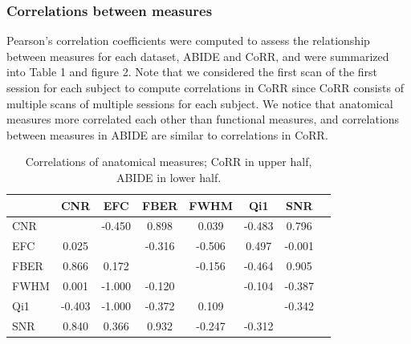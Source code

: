 \documentclass{frontiersSCNS} %
\begin{document}
\subsubsection{Correlations between measures}
\label{sec:25}
Pearson’s correlation coefficients were computed to assess the relationship between measures for each dataset, ABIDE and CoRR, and were summarized into Table 1 and figure 2. Note that we considered the first scan of the first session for each subject to compute correlations in CoRR since CoRR consists of multiple scans of multiple sessions for each subject. We notice that anatomical measures more correlated each other than functional measures, and correlations between measures in ABIDE are similar to correlations in CoRR.
\begin{table}[h]
  \begin{center}
    \begin{tabular}{ | l | c | c | c | c | c | c | p{1.5cm}}
      \hline
       & CNR & EFC & FBER & FWHM & Qi1 & SNR \\ \hline
      CNR &  & -0.450 & 0.898 & 0.039 & -0.483 & 0.796 \\  
      EFC & 0.025 &  & -0.316 & -0.506 & 0.497 & -0.001 \\
      FBER & 0.866 & 0.172 & & -0.156 & -0.464 & 0.905 \\
      FWHM & 0.001 & -1.000 & -0.120 & & -0.104 & -0.387 \\
      Qi1 & -0.403 & -1.000 & -0.372 & 0.109 & & -0.342 \\
      SNR & 0.840 & 0.366 & 0.932 & -0.247 & -0.312 & \\
      \hline
    \end{tabular}
  \end{center}
  \caption{Correlations of anatomical measures; CoRR in upper half, ABIDE in lower half.}
\end{table}
\\
\end{document}
